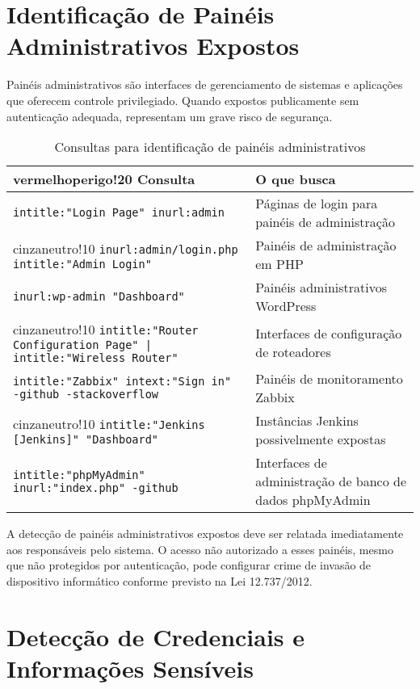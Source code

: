 \documentclass[12pt,a4paper]{book}
\begin{document}
\section{Identificação de Painéis Administrativos Expostos}

Painéis administrativos são interfaces de gerenciamento de sistemas e aplicações que oferecem controle privilegiado. Quando expostos publicamente sem autenticação adequada, representam um grave risco de segurança.

\begin{table}[h]
\centering
\begin{tabular}{|p{8cm}|p{7cm}|}
\hline
{vermelhoperigo!20} \textbf{Consulta} & \textbf{O que busca} \\
\hline
\texttt{intitle:"Login Page" inurl:admin} & Páginas de login para painéis de administração \\
\hline
{cinzaneutro!10} \texttt{inurl:admin/login.php intitle:"Admin Login"} & Painéis de administração em PHP \\
\hline
\texttt{inurl:wp-admin "Dashboard"} & Painéis administrativos WordPress \\
\hline
{cinzaneutro!10} \texttt{intitle:"Router Configuration Page" | intitle:"Wireless Router"} & Interfaces de configuração de roteadores \\
\hline
\texttt{intitle:"Zabbix" intext:"Sign in" -github -stackoverflow} & Painéis de monitoramento Zabbix \\
\hline
{cinzaneutro!10} \texttt{intitle:"Jenkins [Jenkins]" "Dashboard"} & Instâncias Jenkins possivelmente expostas \\
\hline
\texttt{intitle:"phpMyAdmin" inurl:"index.php" -github} & Interfaces de administração de banco de dados phpMyAdmin \\
\hline
\end{tabular}
\caption{Consultas para identificação de painéis administrativos}
\end{table}

\begin{alertbox}
A detecção de painéis administrativos expostos deve ser relatada imediatamente aos responsáveis pelo sistema. O acesso não autorizado a esses painéis, mesmo que não protegidos por autenticação, pode configurar crime de invasão de dispositivo informático conforme previsto na Lei 12.737/2012.
\end{alertbox}

\section{Detecção de Credenciais e Informações Sensíveis}
\end{document}
